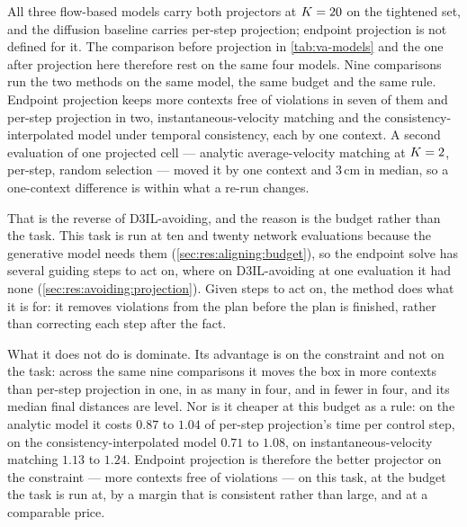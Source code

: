 All three flow-based models carry both projectors at $K=20$ on the tightened set, and the diffusion
baseline carries per-step projection; endpoint projection is not defined for it. The comparison before
projection in \autoref{tab:va-models} and the one after projection here therefore rest on the same four
models.
Nine comparisons run the two methods on the same model, the same budget and the same rule. Endpoint
projection keeps more contexts free of violations in seven of them and per-step projection in two,
instantaneous-velocity matching and the consistency-interpolated model under temporal consistency, each by
one context. A second evaluation of one projected cell --- analytic average-velocity matching at
$K=2$, per-step, random selection --- moved it by one context and $3$\,cm in median, so a one-context
difference is within what a re-run changes.

That is the reverse of D3IL-avoiding, and the reason is the budget rather than the task. This task is
run at ten and twenty network evaluations because the generative model needs them
(\autoref{sec:res:aligning:budget}), so the endpoint solve has several guiding steps to act on, where on
D3IL-avoiding at one evaluation it had none (\autoref{sec:res:avoiding:projection}). Given steps to act
on, the method does what it is for: it removes violations from the plan before the plan is finished,
rather than correcting each step after the fact.

What it does not do is dominate. Its advantage is on the constraint and not on the task: across the same
nine comparisons it moves the box in more contexts than per-step projection in one, in as many in four,
and in fewer in four, and its median final distances are level. Nor is it cheaper at this budget as a
rule: on the analytic model it costs $0.87$ to $1.04$ of per-step projection's time per control step, on
the consistency-interpolated model $0.71$ to $1.08$, on instantaneous-velocity matching $1.13$ to $1.24$.
Endpoint projection is therefore the better projector on the constraint --- more contexts free of violations --- on this task, at the budget the
task is run at, by a margin that is consistent rather than large, and at a comparable price.

